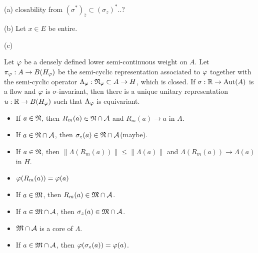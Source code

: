 \documentclass{../../large}
\begin{document}
\begin{pf}
(a)
closability from $(\sigma^*)_{\bar z}\subset(\sigma_z)^*$..?


(b)
Let $x\in E$ be entire.


(c)

Let $\varphi$ be a densely defined lower semi-continuous weight on $A$.
Let $\pi_\varphi:A\to B(H_\varphi)$ be the semi-cyclic representation associated to $\varphi$ together with the semi-cyclic operator $\Lambda_\varphi:\mathfrak{N}_\varphi\subset A\to H$, which is closed.
If $\sigma:\mathbb{R}\to\operatorname{Aut}(A)$ is a flow and $\varphi$ is $\sigma$-invariant, then there is a unique unitary representation $u:\mathbb{R}\to B(H_\varphi)$ such that $\Lambda_\varphi$ is equivariant.

\begin{itemize}
\item If $a\in\mathfrak{N}$, then $R_m(a)\in\mathfrak{N}\cap\mathcal{A}$ and $R_m(a)\to a$ in $A$.
\item If $a\in\mathfrak{N}\cap\mathcal{A}$, then $\sigma_z(a)\in\mathfrak{N}\cap\mathcal{A}$(maybe).
\item If $a\in\mathfrak{N}$, then $\|\Lambda(R_m(a))\|\le\|\Lambda(a)\|$ and $\Lambda(R_m(a))\to \Lambda(a)$ in $H$.
\item $\varphi(R_m(a))=\varphi(a)$
\item If $a\in\mathfrak{M}$, then $R_m(a)\in\mathfrak{M}\cap\mathcal{A}$.
\item If $a\in\mathfrak{M}\cap\mathcal{A}$, then $\sigma_z(a)\in\mathfrak{M}\cap\mathcal{A}$.
\item $\mathfrak{M}\cap\mathcal{A}$ is a core of $\Lambda$.
\item If $a\in\mathfrak{M}\cap\mathcal{A}$, then $\varphi(\sigma_z(a))=\varphi(a)$.
\end{itemize}

\end{pf}
\end{document}
